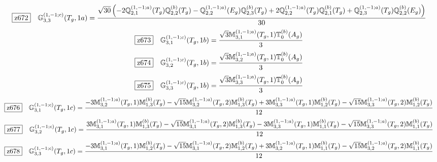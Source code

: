 \documentclass[fleqn,10pt,landscape]{jsarticle}
\begin{document}
\begin{dmath*}
\hspace*{3mm}\fbox{z672}\quad \mathbb{G}_{3,3}^{(1,-1;c)}(T_{g},1a)=\frac{\sqrt{30} \left(- 2 \mathbb{Q}_{2,1}^{(1,-1;a)}(T_{g}) \mathbb{Q}_{2,2}^{(b)}(T_{g}) - \mathbb{Q}_{2,2}^{(1,-1;a)}(E_{g}) \mathbb{Q}_{2,3}^{(b)}(T_{g}) + 2 \mathbb{Q}_{2,2}^{(1,-1;a)}(T_{g}) \mathbb{Q}_{2,1}^{(b)}(T_{g}) + \mathbb{Q}_{2,3}^{(1,-1;a)}(T_{g}) \mathbb{Q}_{2,2}^{(b)}(E_{g})\right)}{30}
\end{dmath*}
\begin{dmath*}
\hspace*{3mm}\fbox{z673}\quad \mathbb{G}_{3,1}^{(1,-1;c)}(T_{g},1b)=\frac{\sqrt{3} \mathbb{M}_{3,1}^{(1,-1;a)}(T_{g},1) \mathbb{T}_{0}^{(b)}(A_{g})}{3}
\end{dmath*}
\begin{dmath*}
\hspace*{3mm}\fbox{z674}\quad \mathbb{G}_{3,2}^{(1,-1;c)}(T_{g},1b)=\frac{\sqrt{3} \mathbb{M}_{3,2}^{(1,-1;a)}(T_{g},1) \mathbb{T}_{0}^{(b)}(A_{g})}{3}
\end{dmath*}
\begin{dmath*}
\hspace*{3mm}\fbox{z675}\quad \mathbb{G}_{3,3}^{(1,-1;c)}(T_{g},1b)=\frac{\sqrt{3} \mathbb{M}_{3,3}^{(1,-1;a)}(T_{g},1) \mathbb{T}_{0}^{(b)}(A_{g})}{3}
\end{dmath*}
\begin{dmath*}
\hspace*{3mm}\fbox{z676}\quad \mathbb{G}_{3,1}^{(1,-1;c)}(T_{g},1c)=\frac{- 3 \mathbb{M}_{3,2}^{(1,-1;a)}(T_{g},1) \mathbb{M}_{1,3}^{(b)}(T_{g}) - \sqrt{15} \mathbb{M}_{3,2}^{(1,-1;a)}(T_{g},2) \mathbb{M}_{1,3}^{(b)}(T_{g}) + 3 \mathbb{M}_{3,3}^{(1,-1;a)}(T_{g},1) \mathbb{M}_{1,2}^{(b)}(T_{g}) - \sqrt{15} \mathbb{M}_{3,3}^{(1,-1;a)}(T_{g},2) \mathbb{M}_{1,2}^{(b)}(T_{g})}{12}
\end{dmath*}
\begin{dmath*}
\hspace*{3mm}\fbox{z677}\quad \mathbb{G}_{3,2}^{(1,-1;c)}(T_{g},1c)=\frac{3 \mathbb{M}_{3,1}^{(1,-1;a)}(T_{g},1) \mathbb{M}_{1,3}^{(b)}(T_{g}) - \sqrt{15} \mathbb{M}_{3,1}^{(1,-1;a)}(T_{g},2) \mathbb{M}_{1,3}^{(b)}(T_{g}) - 3 \mathbb{M}_{3,3}^{(1,-1;a)}(T_{g},1) \mathbb{M}_{1,1}^{(b)}(T_{g}) - \sqrt{15} \mathbb{M}_{3,3}^{(1,-1;a)}(T_{g},2) \mathbb{M}_{1,1}^{(b)}(T_{g})}{12}
\end{dmath*}
\begin{dmath*}
\hspace*{3mm}\fbox{z678}\quad \mathbb{G}_{3,3}^{(1,-1;c)}(T_{g},1c)=\frac{- 3 \mathbb{M}_{3,1}^{(1,-1;a)}(T_{g},1) \mathbb{M}_{1,2}^{(b)}(T_{g}) - \sqrt{15} \mathbb{M}_{3,1}^{(1,-1;a)}(T_{g},2) \mathbb{M}_{1,2}^{(b)}(T_{g}) + 3 \mathbb{M}_{3,2}^{(1,-1;a)}(T_{g},1) \mathbb{M}_{1,1}^{(b)}(T_{g}) - \sqrt{15} \mathbb{M}_{3,2}^{(1,-1;a)}(T_{g},2) \mathbb{M}_{1,1}^{(b)}(T_{g})}{12}
\end{dmath*}
\end{document}

